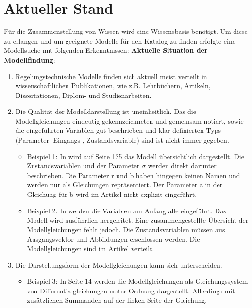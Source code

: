 \section{Aktueller Stand}
\label{Ch:ErstProz:Sec:CurrentState}
Für die Zusammenstellung von Wissen wird eine Wissensbasis benötigt. Um diese zu erlangen und um geeignete Modelle für den Katalog zu finden erfolgte eine Modellsuche mit folgenden Erkenntnissen:
\textbf{Aktuelle Situation der Modellfindung}: 
\begin{enumerate}
	\item Regelungstechnische Modelle finden sich aktuell meist verteilt in wissenschaftlichen Publikationen, wie z.B. Lehrbüchern, Artikeln, Dissertationen, Diplom- und Studienarbeiten.
	\item Die Qualität der Modelldarstellung ist uneinheitlich. Das die Modellgleichungen eindeutig gekennzeichneten und gemeinsam notiert, sowie die eingeführten Variablen gut beschrieben und klar definierten Typs (Parameter, Eingangs-, Zustandsvariable) sind ist nicht immer gegeben.
	\begin{itemize}[label=$\bullet$]
		\item Beispiel 1: In \cite{LOR63} wird auf Seite 135 das Modell übersichtlich dargestellt. Die Zustandsvariablen und der Parameter $\sigma$ werden direkt darunter beschrieben. Die Parameter r und b haben hingegen keinen Namen und werden nur als Gleichungen repräsentiert. Der Parameter a in der Gleichung für b wird im Artikel nicht explizit eingeführt.
		\item Beispiel 2: In \cite{YIFREA09} werden die Variablen am Anfang alle eingeführt. Das Modell wird ausführlich hergeleitet. Eine zusammengestellte Übersicht der Modellgleichungen fehlt jedoch. Die Zustandsvariablen müssen aus Ausgangsvektor und Abbildungen erschlossen werden. Die Modellgleichungen sind im Artikel verteilt.
	\end{itemize}
	\item Die Darstellungsform der Modellgleichungen kann sich unterscheiden.
	\begin{itemize}[label=$\bullet$]
		\item Beispiel 3: In \cite{SILEEA12} Seite 14 werden die Modellgleichungen als Gleichungssystem von Differentialgleichungen erster Ordnung dargestellt. Allerdings mit zusätzlichen Summanden auf der linken Seite der Gleichung.

\end{itemize}
\end{enumerate}
